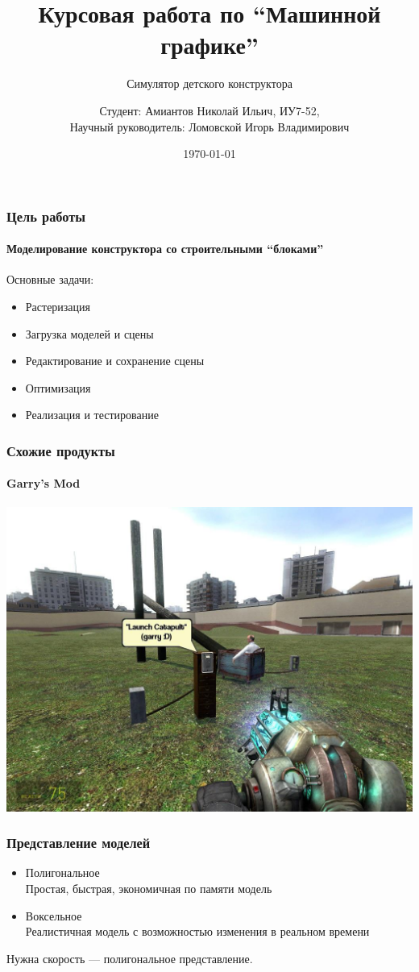 \documentclass{beamer}
\title[Машинная графика]{Курсовая работа по ``Машинной графике''}
\subtitle{Симулятор детского конструктора}
\author{Студент: {Амиантов Николай Ильич, ИУ7-52}, \\
Научный руководитель: {Ломовской Игорь Владимирович}}
\date{\today}
\begin{document}
\frame{\titlepage}

\begin{frame}

\begin{frame}
\frametitle{Цель работы}
\framesubtitle{Моделирование конструктора со строительными ``блоками''}

Основные задачи:
\begin{itemize}
\item Растеризация
\item Загрузка моделей и сцены
\item Редактирование и сохранение сцены
\item Оптимизация
\item Реализация и тестирование
\end{itemize}
\end{frame}

\begin{frame}
\frametitle{Схожие продукты}
\framesubtitle{Garry's Mod}

\centering
\includegraphics[width=\textwidth]{garrysmod}
\end{frame}

\begin{frame}
\frametitle{Представление моделей}

\begin{itemize}
\item Полигональное \\
Простая, быстрая, экономичная по памяти модель
\item Воксельное \\
Реалистичная модель с возможностью изменения в реальном времени
\end{itemize}
Нужна скорость --- полигональное представление.
\end{frame}


\end{frame}
\end{document}
